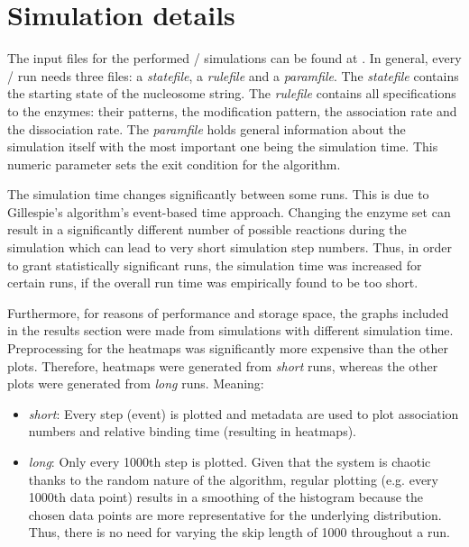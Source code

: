     \section{Simulation details}
    \label{sec:simulationDetails}
        The input files for the performed \ed/ simulations can be found at \cite{Krecké2021}. In general, every \ed/ run needs three files: a \textit{statefile}, a \textit{rulefile} and a \textit{paramfile}. The \textit{statefile} contains the starting state of the nucleosome string. The \textit{rulefile} contains all specifications to the enzymes: their patterns, the modification pattern, the association rate and the dissociation rate. The \textit{paramfile} holds general information about the simulation itself with the most important one being the simulation time. This numeric parameter sets the exit condition for the algorithm.

        The simulation time changes significantly between some runs. This is due to Gillespie's algorithm's event-based time approach. Changing the enzyme set can result in a significantly different number of possible reactions during the simulation which can lead to very short simulation step numbers. Thus, in order to grant statistically significant runs, the simulation time was increased for certain runs, if the overall run time was empirically found to be too short.

        Furthermore, for reasons of performance and storage space, the graphs included in the results section were made from simulations with different simulation time. Preprocessing for the heatmaps was significantly more expensive than the other plots. Therefore, heatmaps were generated from \textit{short} runs, whereas the other plots were generated from \textit{long} runs. Meaning:

        \begin{itemize}
            \item \textit{short}: Every step (event) is plotted and metadata are used to plot association numbers and relative binding time (resulting in heatmaps).
            \item \textit{long}: Only every 1000th step is plotted. Given that the system is chaotic thanks to the random nature of the algorithm, regular plotting (e.g. every 1000th data point) results in a smoothing of the histogram because the chosen data points are more representative for the underlying distribution. Thus, there is no need for varying the skip length of 1000 throughout a run.
        \end{itemize}
%
%
